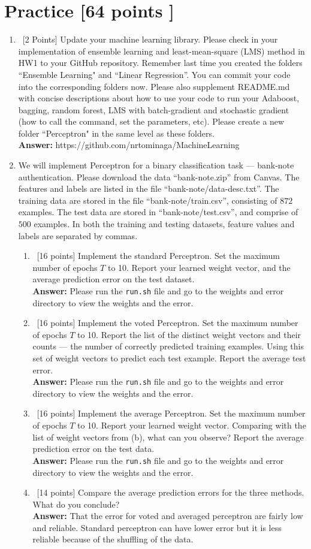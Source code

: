 \documentclass[12pt, fullpage,letterpaper]{article}
\newcommand{\Answer}{{\\\textbf{Answer: }}}
\begin{document}
\section{Practice [64 points ]}
\begin{enumerate}
	\item~[2 Points] Update your machine learning library. Please check in your implementation of ensemble learning and least-mean-square (LMS) method in HW1 to your GitHub repository. Remember last time you created the folders ``Ensemble Learning" and ``Linear Regression''. You can commit your code into the corresponding folders now. Please also supplement README.md with concise descriptions about how to use your code to run your Adaboost, bagging, random forest, LMS with batch-gradient and stochastic gradient (how to call the command, set the parameters, etc). Please create a new folder ``Perceptron" in the same level as these folders.  
	\Answer https://github.com/nrtominaga/MachineLearning
\item We will implement  Perceptron for a binary classification task --- bank-note authentication. Please download the data ``bank-note.zip'' from Canvas. The features and labels are listed in the file ``bank-note/data-desc.txt''. The training data are stored in the file ``bank-note/train.csv'', consisting of $872$ examples. The test data are stored in ``bank-note/test.csv'', and comprise of $500$ examples. In both the training and testing datasets, feature values and labels are separated by commas. 
\begin{enumerate}
	\item~[16 points] Implement the standard Perceptron. Set the maximum number of epochs $T$ to 10. Report your learned weight vector, and the average prediction error on the test dataset. 
	\Answer Please run the {\tt run.sh} file and go to the weights and error directory to view the weights and the error.
	\item~[16 points] Implement the voted Perceptron. Set the maximum number of epochs $T$ to 10. Report the list of the distinct weight vectors and their counts --- the number of correctly predicted training examples. Using this set of weight vectors to predict each test example. Report the average test error. 
	\Answer Please run the {\tt run.sh} file and go to the weights and error directory to view the weights and the error.
	\item~[16 points] Implement the average Perceptron. Set the maximum number of epochs $T$ to 10. Report your learned weight vector. Comparing with the list of weight vectors from (b), what can you observe? Report the average prediction error on the test data. 
	\Answer Please run the {\tt run.sh} file and go to the weights and error directory to view the weights and the error.
	\item~[14 points] Compare the average prediction errors for the three methods. What do you conclude? 
	\Answer
	That the error for voted and averaged perceptron are fairly low and reliable.  Standard perceptron can have lower error but it is less reliable because of the shuffling of the data.
\end{enumerate}


\end{enumerate}
\end{document}
